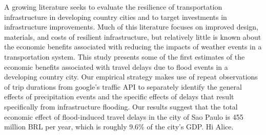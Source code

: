 \documentclass[11pt]{article}
\begin{document}
\hfill \break
A growing literature seeks to evaluate the resilience of transportation infrastructure in developing country cities and to target investments in infrastructure improvements.  Much of this literature focuses on improved design, materials, and costs of resilient infrastructure, but relatively little is known about the economic benefits associated with reducing the impacts of weather events in a transportation system.  This study presents some of the first estimates of the economic benefits associated with travel delays due to flood events in a developing country city.  Our empirical strategy makes use of repeat observations of trip durations from google's traffic API to separately identify the general effects of precipitation events and the specific effects of delays that result specifically from infrastructure flooding.  Our results suggest that the total economic effect of flood-induced travel delays in the city of Sao Paulo is 455 million BRL per year, which is roughly 9.6\% of the city's GDP. Hi Alice.
\end{document}
